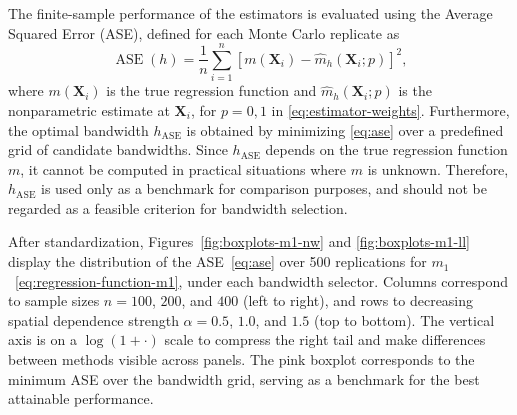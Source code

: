 \documentclass[12pt]{report} %
\newcommand{\bX}{\mathbf{X}}
\begin{document}

The finite-sample performance of the estimators is evaluated using the  Average Squared Error (ASE), defined for each Monte Carlo replicate as
\begin{equation}
\label{eq:ase}
    \operatorname{ASE}(h) = \frac{1}{n}\sum_{i=1}^{n} 
    \left[m(\bX_i) - \hat{m}_{h}(\bX_i;p) \right]^2,
\end{equation}
where $m(\bX_i)$ is the true regression function and 
$\hat{m}_{h}(\bX_i;p)$ is the nonparametric estimate at $\bX_i$, 
for $p = 0,1$ in \eqref{eq:estimator-weights}. Furthermore, the optimal bandwidth $h_{\mathrm{ASE}}$ is obtained by minimizing \eqref{eq:ase} over a predefined grid of candidate bandwidths. Since $h_{\mathrm{ASE}}$ depends on the true regression function $m$, it cannot be computed in practical situations where $m$ is unknown. Therefore, $h_{\mathrm{ASE}}$ is used only as a benchmark for comparison purposes, and should not be regarded as a feasible criterion for bandwidth selection.


After standardization, Figures~\ref{fig:boxplots-m1-nw} and \ref{fig:boxplots-m1-ll} display the distribution of the ASE~\eqref{eq:ase} over 500 replications for $m_1$~\eqref{eq:regression-function-m1}, under each bandwidth selector. Columns correspond to sample sizes $n=100$, $200$, and $400$ (left to right), and rows to decreasing spatial dependence strength $\alpha=0.5$, $1.0$, and $1.5$ (top to bottom). The vertical axis is on a $\log(1+\cdot)$ scale to compress the right tail and make differences between methods visible across panels. The pink boxplot corresponds to the minimum ASE over the bandwidth grid, serving as a benchmark for the best attainable performance.
\end{document}

